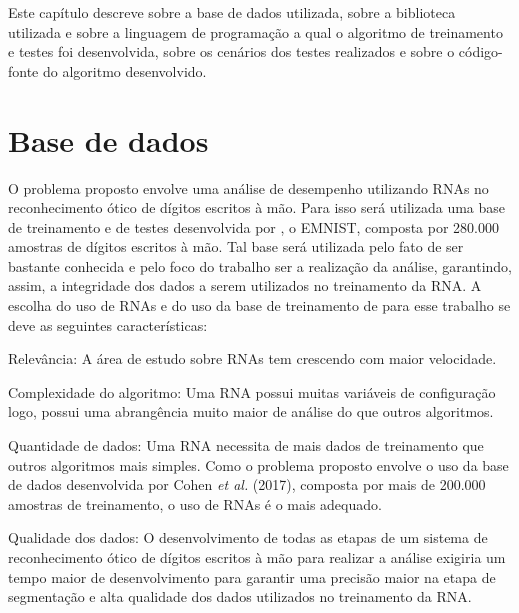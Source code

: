 \documentclass[12pt,oneside,a4paper,chapter=TITLE,section=TITLE,sumario
		=tradicional]{abntex2}
\begin{document}
		Este capítulo descreve sobre a base de dados utilizada, sobre a biblioteca utilizada e sobre a linguagem de programação a qual o algoritmo de treinamento e testes foi desenvolvida, sobre os cenários dos testes realizados e sobre o código-fonte do algoritmo desenvolvido.
				
		\section{Base de dados}
		\label{sec:base}
		
		O problema proposto envolve uma análise de desempenho utilizando RNAs no reconhecimento ótico de dígitos escritos à mão. Para isso será utilizada uma base de treinamento e de testes desenvolvida por , o EMNIST, composta por 280.000 amostras de dígitos escritos à mão. Tal base será utilizada pelo fato de ser bastante conhecida e pelo foco do trabalho ser a realização da análise, garantindo, assim, a integridade dos dados a serem utilizados no treinamento da RNA. A escolha do uso de RNAs e do uso da base de treinamento de  para esse trabalho se deve as seguintes características:
		
		\begin{lista}
			\item Relevância: A área de estudo sobre RNAs tem crescendo com maior velocidade.
					
			\item Complexidade do algoritmo: Uma RNA possui muitas variáveis de configuração logo, possui uma abrangência muito maior de análise do que outros algoritmos. 
			
			\item Quantidade de dados: Uma RNA necessita de mais dados de treinamento que outros algoritmos mais simples. Como o problema proposto envolve o uso da base de dados desenvolvida por Cohen \textit{et al.} (2017), composta por mais de 200.000 amostras de treinamento, o uso de RNAs é o mais adequado.
			
			\item Qualidade dos dados: O desenvolvimento de todas as etapas de um sistema de reconhecimento ótico de dígitos escritos à mão para realizar a análise exigiria um tempo maior de desenvolvimento para garantir uma precisão maior na etapa de segmentação e alta qualidade dos dados utilizados no treinamento da RNA.
			
		\end{lista}
		
\end{document}
